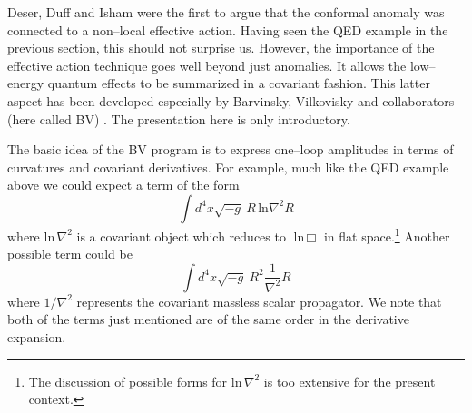 \documentclass[12pt]{article}
\newcommand{\be}{\begin{equation}}
\newcommand{\ee}{\end{equation}}
\begin{document}
Deser, Duff and Isham \cite{Deser:1976yx} were the first to argue that the conformal anomaly was connected to a non--local effective action. Having seen the QED example in the previous section, this should not surprise us. However, the importance of the effective action technique goes well beyond just anomalies. It allows the low--energy quantum effects to be summarized in a covariant fashion. This latter aspect has been developed especially by Barvinsky, Vilkovisky and collaborators (here called BV) \cite{Barvinsky:1985an, Barvinsky:1993en, Buchbinder:1992rb}. The presentation here is only introductory.

The basic idea of the BV program is to express one--loop amplitudes in terms of curvatures and covariant derivatives. For example, much like the QED example above we could expect a term of the form
\be
\int d^4x \sqrt{-g} ~ R \,\text{ln} \nabla^2 R
\ee
where $\text{ln}\, \nabla^2 $ is a covariant object which reduces to $\text{ln}\, \Box$ in flat space.\footnote{The discussion of possible forms for $\text{ln}\, \nabla^2$ is too extensive for the present context.} Another possible term could be
\be
\int d^4x \sqrt{-g} ~ R^2 \frac{1}{\nabla^2} R
\label{thirdorder}
\ee
where $1/\nabla^2$ represents the covariant massless scalar propagator. We note that both of the terms just mentioned are of the same order in the derivative expansion.
\end{document}
